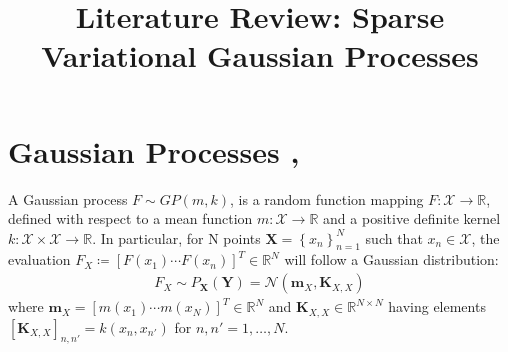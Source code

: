 \documentclass[twoside,11pt]{article}
\begin{document}
\title{Literature Review: Sparse Variational Gaussian Processes}
\maketitle
\section{Gaussian Processes \cite{wild2022generalized}, \cite{wild2023connections}}
A Gaussian process $F \sim GP(m, k)$, is a random function mapping $F: \mathcal{X} \rightarrow \mathbb{R}$, defined with respect to a mean function $m: \mathcal{X} \rightarrow \mathbb{R}$ and a positive definite kernel $k: \mathcal{X} \times \mathcal{X} \rightarrow \mathbb{R}$. In particular, for N points $\mathbf{X} = \left\{ x_n\right\}_{n=1}^N$ such that $x_n \in \mathcal{X}$, the evaluation $F_X \coloneqq \left[F(x_1) \cdots F(x_n)\right]^T \in \mathbb{R}^N$ will follow a Gaussian distribution:
\begin{align}
    F_X \sim P_{\mathbf{X}}(\mathbf{Y}) = \mathcal{N}(\mathbf{m}_X, \mathbf{K}_{X, X})
    \label{gp-prior}
\end{align}
where $\mathbf{m}_X = \left[ m(x_1) \cdots m(x_N)\right]^T \in \mathbb{R}^N$ and $\mathbf{K}_{X, X} \in \mathbb{R}^{N \times N}$ having elements $\left[\mathbf{K}_{X, X}\right]_{n, n'} = k(x_n, x_{n'})$ for $n, n'=1,\dots, N$. 
\end{document}
